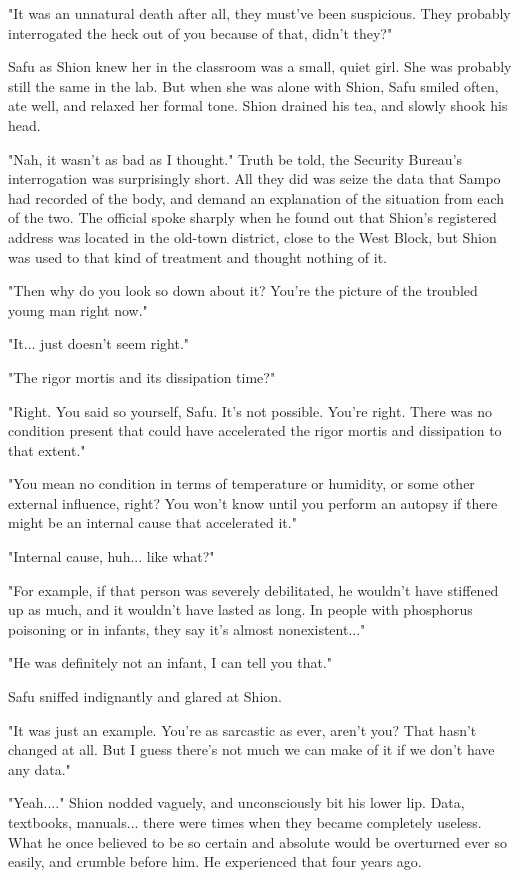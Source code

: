 "It was an unnatural death after all, they must've been suspicious. They
probably interrogated the heck out of you because of that, didn't they?"

Safu as Shion knew her in the classroom was a small, quiet girl. She was
probably still the same in the lab. But when she was alone with Shion,
Safu smiled often, ate well, and relaxed her formal tone. Shion drained
his tea, and slowly shook his head.

"Nah, it wasn't as bad as I thought." Truth be told, the Security
Bureau's interrogation was surprisingly short. All they did was seize
the data that Sampo had recorded of the body, and demand an explanation
of the situation from each of the two. The official spoke sharply when
he found out that Shion's registered address was located in the old-town
district, close to the West Block, but Shion was used to that kind of
treatment and thought nothing of it.

"Then why do you look so down about it? You're the picture of the
troubled young man right now."

"It... just doesn't seem right."

"The rigor mortis and its dissipation time?"

"Right. You said so yourself, Safu. It's not possible. You're right.
There was no condition present that could have accelerated the rigor
mortis and dissipation to that extent."

"You mean no condition in terms of temperature or humidity, or some
other external influence, right? You won't know until you perform an
autopsy if there might be an internal cause that accelerated it."

"Internal cause, huh... like what?"

"For example, if that person was severely debilitated, he wouldn't have
stiffened up as much, and it wouldn't have lasted as long. In people
with phosphorus poisoning or in infants, they say it's almost
nonexistent..."

"He was definitely not an infant, I can tell you that."

Safu sniffed indignantly and glared at Shion.

"It was just an example. You're as sarcastic as ever, aren't you? That
hasn't changed at all. But I guess there's not much we can make of it if
we don't have any data."

"Yeah...." Shion nodded vaguely, and unconsciously bit his lower lip.
Data, textbooks, manuals... there were times when they became completely
useless. What he once believed to be so certain and absolute would be
overturned ever so easily, and crumble before him. He experienced that
four years ago.

